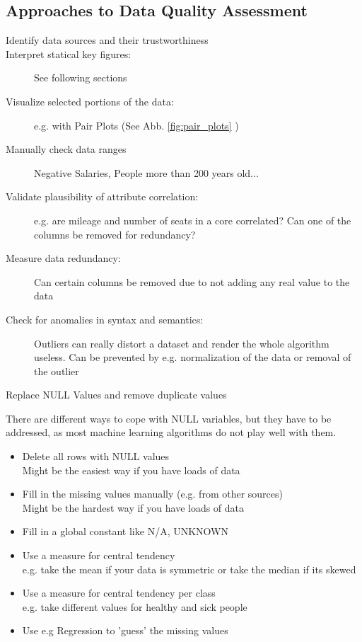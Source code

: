 \documentclass[11pt]{article}
\begin{document}
\subsection{Approaches to Data Quality Assessment}

\begin{description}
    \item[Identify data sources and their trustworthiness]
    \item[Interpret statical key figures: ] See following sections
    \item[Visualize selected portions of the data: ] e.g. with Pair Plots (See Abb. \ref{fig:pair_plots} )
    \item[Manually check data ranges] Negative Salaries, People more than 200 years old...
    \item[Validate plausibility of attribute correlation: ] e.g. are mileage and number of seats in a core correlated? Can one of the columns be removed for redundancy?
    \item[Measure data redundancy: ] Can certain columns be removed due to not adding any real value to the data
    \item[Check for anomalies in syntax and semantics: ] Outliers can really distort a dataset and render the whole algorithm useless. Can be prevented by e.g. normalization of the data or removal of the outlier
    \item[Replace NULL Values and remove duplicate values]
\end{description}

There are different ways to cope with NULL variables, but they have to be addressed, as most machine learning algorithms do not play well with them.

\begin{itemize}
    \item Delete all rows with NULL values \\
          Might be the easiest way if you have loads of data
    \item Fill in the missing values manually (e.g. from other sources) \\
          Might be the hardest way if you have loads of data
    \item Fill in a global constant like N/A, UNKNOWN
    \item Use a measure for central tendency \\
          e.g. take the mean if your data is symmetric or take the median if its skewed
    \item Use a measure for central tendency per class \\
          e.g. take different values for healthy and sick people
    \item Use e.g Regression to 'guess' the missing values
\end{itemize}
\end{document}

